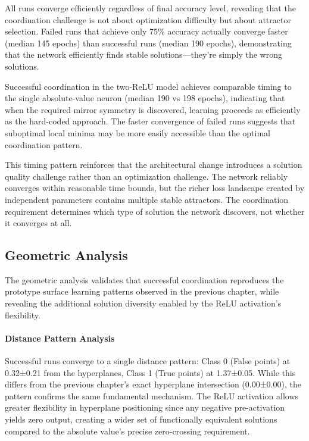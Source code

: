 All runs converge efficiently regardless of final accuracy level, revealing that the coordination challenge is not about optimization difficulty but about attractor selection. Failed runs that achieve only 75\% accuracy actually converge faster (median 145 epochs) than successful runs (median 190 epochs), demonstrating that the network efficiently finds stable solutions—they're simply the wrong solutions.

Successful coordination in the two-ReLU model achieves comparable timing to the single absolute-value neuron (median 190 vs 198 epochs), indicating that when the required mirror symmetry is discovered, learning proceeds as efficiently as the hard-coded approach. The faster convergence of failed runs suggests that suboptimal local minima may be more easily accessible than the optimal coordination pattern.

This timing pattern reinforces that the architectural change introduces a solution quality challenge rather than an optimization challenge. The network reliably converges within reasonable time bounds, but the richer loss landscape created by independent parameters contains multiple stable attractors. The coordination requirement determines which type of solution the network discovers, not whether it converges at all.


\subsection*{Geometric Analysis}

The geometric analysis validates that successful coordination reproduces the prototype surface learning patterns observed in the previous chapter, while revealing the additional solution diversity enabled by the ReLU activation's flexibility.

\paragraph{Distance Pattern Analysis}
Successful runs converge to a single distance pattern: Class 0 (False points) at 0.32±0.21 from the hyperplanes, Class 1 (True points) at 1.37±0.05. While this differs from the previous chapter's exact hyperplane intersection (0.00±0.00), the pattern confirms the same fundamental mechanism. The ReLU activation allows greater flexibility in hyperplane positioning since any negative pre-activation yields zero output, creating a wider set of functionally equivalent solutions compared to the absolute value's precise zero-crossing requirement.

